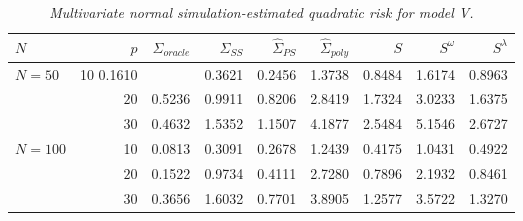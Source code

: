 \begin{table}[H]
\centering
\caption{\textit{Multivariate normal simulation-estimated quadratic risk  for model V.} }
\begin{tabular}{lrrrrrrrr}
 $N$ & $p$ &$\hat{\Sigma}_{oracle}$& $\hat{\Sigma}_{SS}$& $\hat{\Sigma}_{PS}$ & $\hat{\Sigma}_{poly}$ & $S$ &$S^\omega$& $S^\lambda$ \\ 
  \hline
   $N = 50$ & 10   0.1610 & & 0.3621 & 0.2456 & 1.3738 & 0.8484 & 1.6174 & 0.8963 \\ 
     		& $20$ & 0.5236 & 0.9911 & 0.8206 &  2.8419 & 1.7324 & 3.0233 & 1.6375 \\ 
     		& $30$ & 0.4632 & 1.5352 & 1.1507 & 4.1877 & 2.5484 & 5.1546 & 2.6727 \\ 
  $N = 100$ & 10 &  0.0813 & 0.3091 & 0.2678 & 1.2439 & 0.4175 & 1.0431 & 0.4922 \\ 
     		 & $20$ &0.1522 & 0.9734 & 0.4111 &  2.7280 & 0.7896 & 2.1932 & 0.8461 \\ 
     & $30$ &0.3656 & 1.6032 & 0.7701 &  3.8905 & 1.2577 & 3.5722 & 1.3270 \\ 
   \hline
\end{tabular}
\label{table:simulation-1-quad-loss-sigma-5}
\end{table}
%


